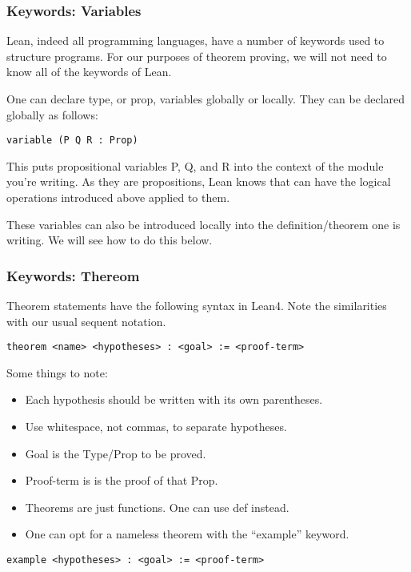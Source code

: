 \documentclass{beamer}
\theoremstyle{indentDefn} \newtheorem{defn}[]{Definition}
\begin{document}
\begin{frame}[fragile]
\frametitle{Keywords: Variables}

Lean, indeed all programming languages, have a number of keywords used to structure programs. For our purposes of theorem proving, we will not need to know all of the keywords of Lean. 

One can declare type, or prop, variables globally or locally. They can be declared globally as follows: 

\begin{lstlisting}
variable (P Q R : Prop)
\end{lstlisting}

This puts propositional variables P, Q, and R into the context of the module you're writing. As they are propositions, Lean knows that can have the logical operations introduced above applied to them.

These variables can also be introduced locally into the definition/theorem one is writing. We will see how to do this below.

\end{frame}

\begin{frame}[fragile]
	\frametitle{Keywords: Thereom}

Theorem statements have the following syntax in Lean4. Note the similarities with our usual sequent notation.

\vspace{5mm}

\small{
\begin{lstlisting}
theorem <name> <hypotheses> : <goal> := <proof-term>
\end{lstlisting}	}

Some things to note: 
\begin{itemize}
	\item Each hypothesis should be written with its own parentheses. 
	\item Use whitespace, not commas, to separate hypotheses.
	\item Goal is the Type/Prop to be proved.
	\item Proof-term is is the proof of that Prop.
	\item Theorems are just functions. One can use def instead.
	\item One can opt for a nameless theorem with the ``example'' keyword. 
\end{itemize}

\small{
\begin{lstlisting}
example <hypotheses> : <goal> := <proof-term>
\end{lstlisting}	}
\end{frame}
\end{document}
